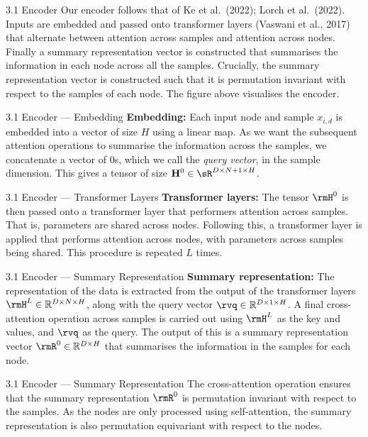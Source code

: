 \documentclass[aspectratio=169,10pt]{beamer}
\begin{document}
\begin{frame}{3.1 Encoder}
Our encoder follows that of Ke et al.\ (2022); Lorch et al.\ (2022). Inputs are embedded and passed onto transformer layers (Vaswani et al., 2017) that alternate between attention across samples and attention across nodes. Finally a summary representation vector is constructed that summarises the information in each node across all the samples. Crucially, the summary representation vector is constructed such that it is permutation invariant with respect to the samples of each node. The figure above visualises the encoder.
\end{frame}

\begin{frame}{3.1 Encoder --- Embedding}
\textbf{Embedding:}\quad
Each input node and sample $x_{i,d}$ is embedded into a vector of size $H$ using a linear map. As we want the subsequent attention operations to summarise the information across the samples, we concatenate a vector of $0$s, which we call the \textit{query vector}, in the sample dimension. This gives a tensor of size $\mathbf{H}^{0} \in \sR^{D \times N+1 \times H}$.
\end{frame}

\begin{frame}{3.1 Encoder --- Transformer Layers}
\textbf{Transformer layers:}\quad
The tensor $\rmH^0$ is then passed onto a transformer layer that performers attention across samples. That is, parameters are shared across nodes. Following this, a transformer layer is applied that performs attention across nodes, with parameters across samples being shared. This procedure is repeated $L$ times.
\end{frame}

\begin{frame}{3.1 Encoder --- Summary Representation}
\textbf{Summary representation:}\quad
The representation of the data is extracted from the output of the transformer layers $\rmH^L \in \mathbb{R}^{D \times N \times H}$, along with the query vector $\rvq \in \mathbb{R}^{D \times 1 \times H}$. A final cross-attention operation across samples is carried out using $\rmH^L$ as the key and values, and $\rvq$ as the query. The output of this is a summary representation vector $\rmR^0 \in \mathbb{R}^{D \times H}$ that summarises the information in the samples for each node.
\end{frame}

\begin{frame}{3.1 Encoder --- Summary Representation}
The cross-attention operation ensures that the summary representation $\rmR^0$ is permutation invariant with respect to the samples. As the nodes are only processed using self-attention, the summary representation is also permutation equivariant with respect to the nodes.
\end{frame}
\end{document}
